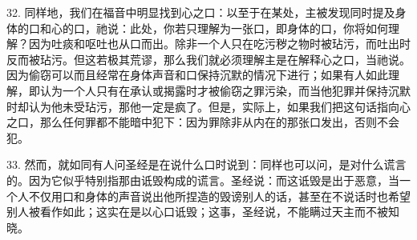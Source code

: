 32. 同样地，我们在福音中明显找到心之口：以至于在某处，主被发现同时提及身体的口和心的口，祂说：此处，你若只理解为一张口，即身体的口，你将如何理解？因为吐痰和呕吐也从口而出。除非一个人只在吃污秽之物时被玷污，而吐出时反而被玷污。但这若极其荒谬，那么我们就必须理解主是在解释心之口，当祂说。因为偷窃可以而且经常在身体声音和口保持沉默的情况下进行；如果有人如此理解，即认为一个人只有在承认或揭露时才被偷窃之罪污染，而当他犯罪并保持沉默时却认为他未受玷污，那他一定是疯了。但是，实际上，如果我们把这句话指向心之口，那么任何罪都不能暗中犯下：因为罪除非从内在的那张口发出，否则不会犯。\par

33. 然而，就如同有人问圣经是在说什么口时说到：同样也可以问，是对什么谎言的。因为它似乎特别指那由诋毁构成的谎言。圣经说：而这诋毁是出于恶意，当一个人不仅用口和身体的声音说出他所捏造的毁谤别人的话，甚至在不说话时也希望别人被看作如此；这实在是以心口诋毁；这事，圣经说，不能瞒过天主而不被知晓。\par

